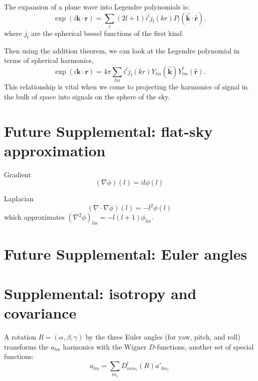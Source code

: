 \begin{subappendices}
The expansion of a plane wave into Legendre polynomials is:
\begin{equation}
  \exp({i \mathbf k \cdot \mathbf r}) = \sum_{l} (2 l + 1) i^l j_l(k r) P_l(\hat{\mathbf k} \cdot \hat{\mathbf r}).
\end{equation}
where $j_l$ are the spherical bessel functions of the first kind.

Then using the addition theorem, we can look at the Legendre polynomial in terms of spherical harmonics,
\begin{equation}
  \exp({i \mathbf{k} \cdot \mathbf{r}}) = 4 \pi \sum_{lm} i^l j_l(k r) Y_{lm}{}(\hat{\mathbf k}) Y_{lm}^{*}(\hat{\mathbf r}).\label{eq:plane_wave_sph_harm} 
\end{equation} 
This relationship is vital when we come to projecting the harmonics of signal in the bulk of space into signals on the sphere of the sky.


\section{Future Supplemental: flat-sky approximation}

Gradient
\begin{equation}
  (\nabla \phi)(l) = il \phi(l)
\end{equation}

Laplacian
\begin{equation}
  (\nabla \cdot \nabla \phi)(l) = -l^2 \phi(l)
\end{equation}
which approximates $(\nabla^2 \phi)_{lm} = -l(l+1) \phi_{lm}$.



\section{Future Supplemental: Euler angles}


\section{Supplemental: isotropy and covariance}

A rotation $R = (\alpha,\beta,\gamma)$ by the three Euler angles (for yaw, pitch, and roll) transforms the $a_{lm}$ harmonics with the Wigner $D$-functions, another set of special functions:
\begin{equation}
  a_{lm} = \sum_{m_1} D^l_{mm_1}(R) a'_{lm_1}
\end{equation}


\end{subappendices}
